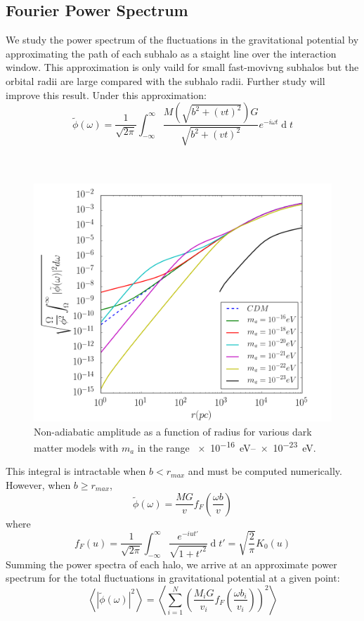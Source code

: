 \documentclass[usenatbib]{mnras}
\renewcommand{\d}[1]{\ensuremath{\operatorname{d}\!{#1}}}
\begin{document}
\subsection{Fourier Power Spectrum}
We study the power spectrum of
the fluctuations in the gravitational
potential by approximating the path of each subhalo as a staight line over the interaction window. This approximation is only vaild for small fast-movivng subhalos but the orbital radii are large compared with the subhalo radii. Further study will improve this result. Under this approximation:
\begin{equation}
\tilde{\phi}(\omega) = \frac{1}{\sqrt{2\pi}}\int_{-\infty}^{\infty} \! \frac{M\left(\sqrt{b^2 + (vt)^2}\right)G}{\sqrt{b^2+(vt)^2}} e^{-i \omega t}\d{t}
\end{equation}
\\ \\

\begin{figure}
\includegraphics[width=\columnwidth]{Non-Adiabatic_Amplitude.png}
\vspace*{-5mm}
\caption{Non-adiabatic amplitude as a function of radius for various dark matter models with $m_a$ in the range \SIrange{e-16}{e-23}{\electronvolt}.}
\label{fig:fourierfluc}
\end{figure}

This integral is intractable when $b < r_{max}$ and must be computed numerically. However, when $b \geq r_{max}$,
\begin{equation}
\tilde{\phi}(\omega) = \frac{MG}{v} f_F\left(\frac{\omega b}{v} \right)
\end{equation} where
\begin{equation}
f_F(u) = \frac{1}{\sqrt{2\pi}} \int_{-\infty}^{\infty} \! \frac{e^{-iut'}}{\sqrt{1 + t'^2}} \d{t'} = \sqrt{\frac{2}{\pi}} K_0(u)
\end{equation}
Summing the power spectra of each halo,
we arrive at an approximate power
spectrum for the total fluctuations in
gravitational potential at a given point:
\begin{equation}
\left<\left| \tilde{\phi}(\omega) \right|^2 \right> = \left< \sum_{i = 1}^N \left(\frac{M_iG}{v_i} f_F\left(\frac{\omega b_i}{v_i} \right)\right)^2 \right>
\end{equation} 
\end{document}
